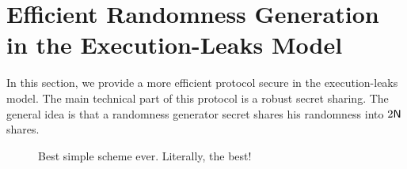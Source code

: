\section{Efficient Randomness Generation in the Execution-Leaks Model}

In this section, we provide a more efficient protocol secure in the execution-leaks model. The main technical part of this protocol is a robust secret sharing. The general idea is that a randomness generator secret shares his randomness into $2\mathsf{N}$ shares. 

\begin{figure}[ht!]%
	\centering%
	\nicoresetlinenr
	\caption{Best simple scheme ever. Literally, the best!}
	\label{simple-figure}
\end{figure}